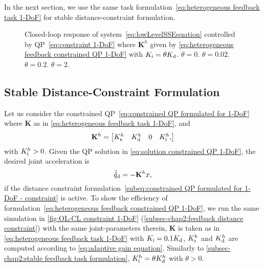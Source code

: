 In the next section, we  use the same task formulation~\eqref{eq:heterogeneous feedback task 1-DoF} for  stable distance-constraint formulation.  
\begin{figure}
	\centering
	\hfil
	\hfil
	\hfil
	\caption{Closed-loop response of system~\eqref{eq:lowLevelSSEquation} controlled by QP~\eqref{eq:constraint 1-DoF} where $\mathbf{K}^h$ given by \cref{eq:heterogeneous feedback constrained QP 1-DoF} with $K_{\rm i} = \theta K_{\rm d}$.  $\theta=0$.  $\theta=0.02$.  $\theta=0.2$.  $\theta=2$.}
	\label{fig:sys2-HCL-constraint-integral}
\end{figure}
\subsection{Stable Distance-Constraint Formulation}
Let us consider the constrained QP~\eqref{eq:constrained QP formulated for 1-DoF} where $\mathbf{K}$ as in \cref{eq:heterogeneous feedback task 1-DoF}, and 
\begin{equation}\label{eq:heterogeneous feedback constrained QP 1-DoF}
	\mathbf{K}^h = \begin{bmatrix}
		K_{\rm s}^h & K_{\rm d}^h & 0 & K_{\rm i}^h,
	\end{bmatrix}
\end{equation}
with $K_{\rm i}^h>0$. Given the QP solution in \cref{eq:solution constrained QP 1-DoF}, the desired joint acceleration is 
\begin{equation}
	\ddot{\hat{q}}_{\rm d} = -\mathbf{K}^h x, 
\end{equation}
if the distance constraint formulation~\eqref{subeq:constrained QP formulated for 1-DoF - constraint} is active. To show the efficiency of formulation~\eqref{eq:heterogeneous feedback constrained QP 1-DoF}, we run the same simulation in \cref{fig:OL-CL constraint 1-DoF} (\cref{subsec-chap2:feedback distance constraint}) with the same joint-parameters therein, $\mathbf{K}$ is taken as in \cref{eq:heterogeneous feedback task 1-DoF} with $K_{\rm i} = 0.1K_{\rm d}$, $K_{\rm s}^h$ and $K_{\rm d}^h$ are computed according to \cref{eq:adaptive gain equation}. Similarly to \cref{subsec-chap2:stable feedback task formulation}, $K_{\rm i}^h = \theta K_{\rm d}^h$ with $\theta>0$.


